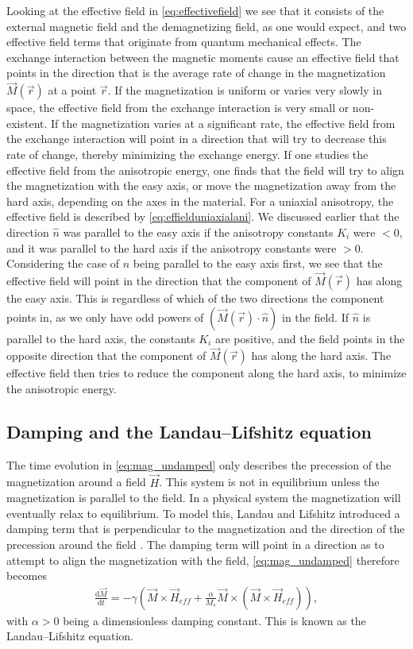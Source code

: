 \documentclass[12pt, a4paper, twoside, openright]{article}		%
\numberwithin{equation}{section}
\begin{document}
Looking at the effective field in \eqref{eq:effectivefield} we see that it consists of the external magnetic field and the demagnetizing field, as one would expect, and two effective field terms that originate from quantum mechanical effects. The exchange interaction between the magnetic moments cause an effective field that points in the direction that is the average rate of change in the magnetization $\vec{M}(\vec{r})$ at a point $\vec{r}$. If the magnetization is uniform or varies very slowly in space, the effective field from the exchange interaction is very small or non-existent. If the magnetization varies at a significant rate, the effective field from the exchange interaction will point in a direction that will try to decrease this rate of change, thereby minimizing the exchange energy. If one studies the effective field from the anisotropic energy, one finds that the field will try to align the magnetization with the easy axis, or move the magnetization away from the hard axis, depending on the axes in the material. For a uniaxial anisotropy, the effective field is described by \eqref{eq:effielduniaxialani}. We discussed earlier that the direction $\hat{n}$ was parallel to the easy axis if the anisotropy constants $K_i$ were $<0$, and it was parallel to the hard axis if the anisotropy constants were $>0$. Considering the case of $\hat{n}$ being parallel to the easy axis first, we see that the effective field will point in the direction that the component of $\vec{M}(\vec{r})$ has along the easy axis. This is regardless of which of the two directions the component points in, as we only have odd powers of $(\vec{M}(\vec{r})\cdot\hat{n})$ in the field. If $\hat{n}$ is parallel to the hard axis, the constants $K_i$ are positive, and the field points in the opposite direction that the component of $\vec{M}(\vec{r})$ has along the hard axis. The effective field then tries to reduce the component along the hard axis, to minimize the anisotropic energy.

\subsection{Damping and the Landau--Lifshitz equation}
The time evolution in \eqref{eq:mag_undamped} only describes the precession of the magnetization around a field $\vec{H}$. This system is not in equilibrium unless the magnetization is parallel to the field. In a physical system the magnetization will eventually relax to equilibrium. To model this, Landau and Lifshitz introduced a damping term that is perpendicular to the magnetization and the direction of the precession around the field \cite{LandauLifshitz1935}. The damping term will point in a direction as to attempt to align the magnetization with the field, \eqref{eq:mag_undamped} therefore becomes
\begin{align}
\label{eq:LL}
\frac{\textrm{d} \vec{M}}{\textrm{d} t} = -\gamma \left(\vec{M} \times \vec{H}_{eff} + \frac{\alpha}{M_s} \vec{M}\times(\vec{M}\times\vec{H}_{eff})\right),
\end{align}
with $\alpha > 0$ being a dimensionless damping constant. This is known as the Landau--Lifshitz equation.
\end{document}
